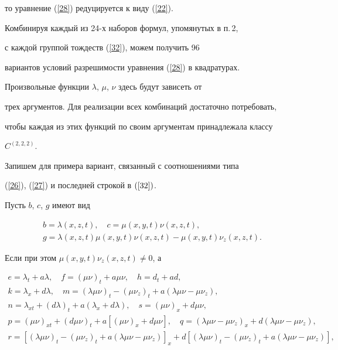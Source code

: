 то уравнение (\ref{28}) редуцируется к виду (\ref{22}).





Комбинируя каждый из 24-х наборов формул, упомянутых в п.\,2,


с каждой группой тождеств (\ref{32}), можем получить 96


вариантов условий разрешимости уравнения (\ref{28}) в квадратурах.


Произвольные функции $\lambda$, $\mu$, $\nu$ здесь будут зависеть от


трех аргументов. Для реализации всех комбинаций достаточно потребовать,


чтобы каждая из этих функций по своим аргументам принадлежала классу


$C^{(2,2,2)}$.





Запишем для примера вариант, связанный с соотношениями типа


(\ref{26}), (\ref{27}) и последней строкой в $(\ref{32})$.


Пусть $b$, $c$, $g$ имеют вид


\begin{gather*}


b=\lambda(x,z,t),\quad c=\mu(x,y,t)\nu(x,z,t),\\


g=\lambda(x,z,t)\mu(x,y,t)\nu(x,z,t)-\mu(x,y,t)\nu_{z}(x,z,t).


\end{gather*}


Если при этом $\mu(x,y,t)\nu_{z}(x,z,t)\ne0$, а 


\begin{gather*}


e=\lambda_{t}+a\lambda,\quad f=(\mu\nu)_{t}+a\mu\nu,\quad h=d_{t}+ad,\\


k=\lambda_{x}+d\lambda,\quad m=(\lambda\mu\nu)_{t}-(\mu\nu_{z})_{t}


+a(\lambda\mu\nu-\mu\nu_{z}),\\


n=\lambda_{xt}+(d\lambda)_{t}+a(\lambda_{x}+d\lambda),\quad


s=(\mu\nu)_{x}+d\mu\nu,\\


p=(\mu\nu)_{xt}+(d\mu\nu)_{t}+a[(\mu\nu)_{x}+d\mu\nu],\quad


q=(\lambda\mu\nu-\mu\nu_{z})_{x}+d(\lambda\mu\nu-\mu\nu_{z}),\\


r=[(\lambda\mu\nu)_{t}-(\mu\nu_{z})_{t}+a(\lambda\mu\nu-\mu\nu_{z})]_{x}


+d[(\lambda\mu\nu)_{t}-(\mu\nu_{z})_{t}+a(\lambda\mu\nu-\mu\nu_{z})],


\end{gather*}


